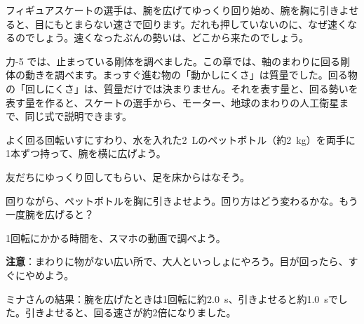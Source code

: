\begin{hatena}
\noindent\begin{minipage}[c]{0.56\linewidth}
フィギュアスケートの選手は、腕を広げてゆっくり回り始め、腕を胸に引きよせると、目にもとまらない速さで回ります。だれも押していないのに、なぜ速くなるのでしょう。速くなったぶんの勢いは、どこから来たのでしょう。
\end{minipage}\hfill
\begin{minipage}[c]{0.4\linewidth}
\centering
{}
\end{minipage}
\end{hatena}

\noindent 力-5 では、止まっている剛体を調べました。この章では、軸のまわりに回る剛体の動きを調べます。まっすぐ進む物の「動かしにくさ」は質量でした。回る物の「回しにくさ」は、質量だけでは決まりません。それを表す量と、回る勢いを表す量を作ると、スケートの選手から、モーター、地球のまわりの人工衛星まで、同じ式で説明できます。

\begin{yattemiyou}
\begin{enumerate}[label={\bkcircled[bkGreen]{\arabic*}}, leftmargin=2.4\zw, itemsep=1pt, topsep=2pt]
\item よく回る回転いすにすわり、水を入れた\qty{2}{L}のペットボトル（約\qty{2}{kg}）を両手に1本ずつ持って、腕を横に広げよう。
\item 友だちにゆっくり回してもらい、足を床からはなそう。
\item 回りながら、ペットボトルを胸に引きよせよう。回り方はどう変わるかな。もう一度腕を広げると？
\item 1回転にかかる時間を、スマホの動画で調べよう。
\end{enumerate}
\textbf{注意}：まわりに物がない広い所で、大人といっしょにやろう。目が回ったら、すぐにやめよう。
\par\vspace{4pt}\noindent ミナさんの結果：腕を広げたときは1回転に約\qty{2.0}{s}、引きよせると約\qty{1.0}{s}でした。引きよせると、回る速さが約2倍になりました。
\end{yattemiyou}


